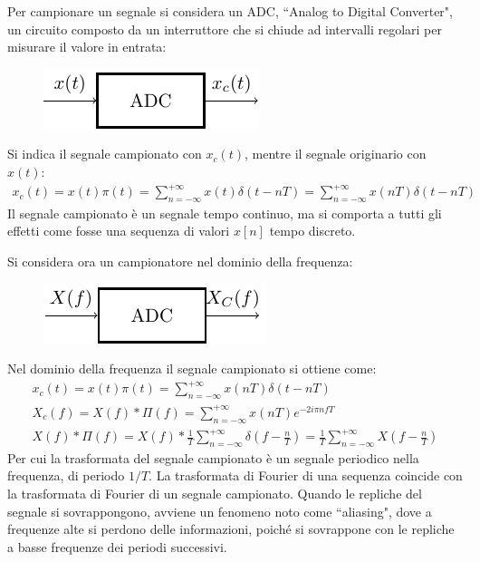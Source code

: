 \documentclass{article}
\numberwithin{equation}{subsection}
\begin{document}
Per campionare un segnale si considera un ADC, ``Analog to Digital Converter", un circuito composto da un interruttore che si chiude ad intervalli regolari per misurare il 
valore in entrata: 
\begin{figure}[H]%
    \centering
    \includegraphics{adc.pdf}%
\end{figure}
Si indica il segnale campionato con $x_c(t)$, mentre il segnale originario con $x(t)$:
\begin{gather}
    x_c(t)=x(t)\pi(t)=\displaystyle\sum_{n=-\infty}^{+\infty}x(t)\delta\left(t-nT\right)=\sum_{n=-\infty}^{+\infty}x(nT)\delta\left(t-nT\right)
\end{gather}
Il segnale campionato è un segnale tempo continuo, ma si comporta a tutti gli effetti come fosse una sequenza di valori $x[n]$ tempo discreto. 

Si considera ora un campionatore nel dominio della frequenza:
\begin{figure}[H]%
    \centering
    \includegraphics{adc-fourier.pdf}%
\end{figure}

Nel dominio della frequenza il segnale campionato si ottiene come:
\begin{gather*}
    x_c(t)=x(t)\pi(t)=\displaystyle\sum_{n=-\infty}^{+\infty}x(nT)\delta\left(t-nT\right)\\
    X_c(f)=X(f)*\Pi(f)=\displaystyle\sum_{n=-\infty}^{+\infty}x(nT)e^{-2i\pi nfT}\\
    X(f)*\Pi(f)=\displaystyle X(f)*\frac{1}{T}\sum_{n=-\infty}^{+\infty}\delta\left(f-\frac{n}{T}\right)=\frac{1}{T}\sum_{n=-\infty}^{+\infty}X\left(f-\frac{n}{T}\right)
\end{gather*}
Per cui la trasformata del segnale campionato è un segnale periodico nella frequenza, di periodo $1/T$. 
La trasformata di Fourier di una sequenza coincide con la trasformata di Fourier di un segnale campionato. 
Quando le repliche del segnale si sovrappongono, avviene un fenomeno 
noto come ``aliasing", dove a frequenze alte si perdono delle informazioni, poiché si sovrappone con le repliche a basse frequenze dei periodi successivi. 
\end{document}

